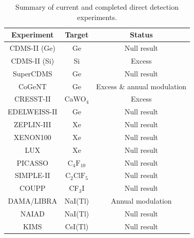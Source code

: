 \begin{table}
	\begin{tabular}{ccc}
		\hline\hline
		Experiment & Target & Status \\
		\hline
		CDMS-II (Ge) \cite{Ahmed:2009b,Ahmed:2009,Ahmed:2011} & Ge & Null result \\
                CDMS-II (Si) \cite{Agnese:2013} & Si & Excess \\
                SuperCDMS \cite{Agnese:2014} & Ge & Null result \\
		CoGeNT \cite{Aalseth:2011a,Aalseth:2011b, Aalseth:2013,Aalseth:2014a,Aalseth:2014b} & Ge & Excess \& annual modulation\\
		CRESST-II \cite{Angloher:2012} & CaWO\(_4\) & Excess\\
		EDELWEISS-II \cite{Armengaud:2011} &  Ge & Null result \\
		ZEPLIN-III \cite{Akimov:2012} & Xe & Null result\\
		XENON100 \cite{Aprile:2011, Aprile:2012b} & Xe & Null result \\
                LUX \cite{Akerib:2014} & Xe & Null result \\
		PICASSO \cite{Archambault:2012} & \(\textrm{C}_4\textrm{F}_{10}\) & Null result \\
		SIMPLE-II \cite{Felizardo:2012} & \(\textrm{C}_2 \textrm{ClF}_5\) & Null result \\
		COUPP \cite{Behnke:2011} & CF\(_3\)I & Null result \\
		DAMA/LIBRA \cite{Bernabei:2008a,Bernabei:2010,Bernabei:2013} &  NaI(Tl) & Annual modulation\\
                NAIAD \cite{Ahmed:2003} & NaI(Tl) & Null result \\
		KIMS \cite{Lee:2007} & CsI(Tl) & Null result \\
		\hline\hline
		\end{tabular}
	\caption{Summary of current and completed direct detection experiments.}
	\label{DD:tab:ExptSummary}
\end{table}




